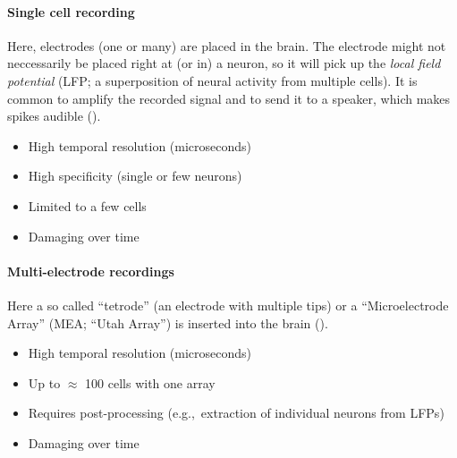 \documentclass[10pt,letterpaper,oneside]{article}
\begin{document}
\paragraph{Single cell recording}
Here, electrodes (one or many) are placed in the brain. The electrode might not neccessarily be placed right at (or in) a neuron, so it will pick up the \emph{local field potential} (LFP; a superposition of neural activity from multiple cells). It is common to amplify the recorded signal and to send it to a speaker, which makes spikes audible ().
\begin{multicols}{2}
	\begin{itemize}
		\item[\OPlus] High temporal resolution (microseconds)
		\item[\OPlus] High specificity (single or few neurons)
	\end{itemize}
	\columnbreak
	\begin{itemize}
		\item[\OMinus] Limited to a few cells
		\item[\OMinus] Damaging over time
	\end{itemize}
\end{multicols}


\paragraph{Multi-electrode recordings}
Here a so called \enquote{tetrode} (an electrode with multiple tips) or a \enquote{Microelectrode Array} (MEA; \enquote{Utah Array}) is inserted into the brain ().
\begin{multicols}{2}
	\begin{itemize}
		\item[\OPlus] High temporal resolution (microseconds)
		\item[\OMeh] Up to $\approx$ 100 cells with one array
		\item[\OMeh] Requires post-processing (e.g.,~extraction of individual neurons from LFPs)
	\end{itemize}
	\columnbreak
	\begin{itemize}
		\item[\OMinus] Damaging over time
	\end{itemize}
\end{multicols}
\end{document}
